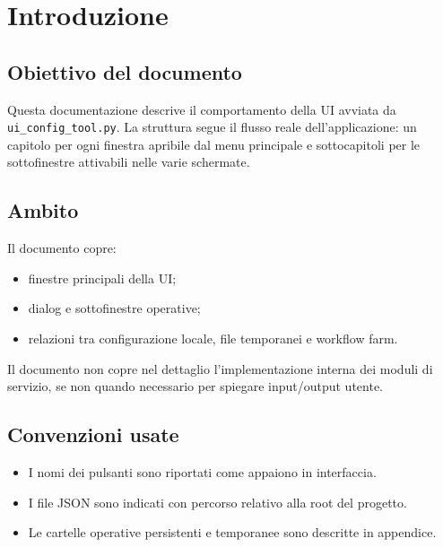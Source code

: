 \chapter{Introduzione}

\section{Obiettivo del documento}
Questa documentazione descrive il comportamento della UI avviata da \texttt{ui\_config\_tool.py}.
La struttura segue il flusso reale dell'applicazione: un capitolo per ogni finestra apribile dal menu principale e sottocapitoli per le sottofinestre attivabili nelle varie schermate.

\section{Ambito}
Il documento copre:
\begin{itemize}[leftmargin=1.5em]
  \item finestre principali della UI;
  \item dialog e sottofinestre operative;
  \item relazioni tra configurazione locale, file temporanei e workflow farm.
\end{itemize}

Il documento non copre nel dettaglio l'implementazione interna dei moduli di servizio, se non quando necessario per spiegare input/output utente.

\section{Convenzioni usate}
\begin{itemize}[leftmargin=1.5em]
  \item I nomi dei pulsanti sono riportati come appaiono in interfaccia.
  \item I file JSON sono indicati con percorso relativo alla root del progetto.
  \item Le cartelle operative persistenti e temporanee sono descritte in appendice.
\end{itemize}
